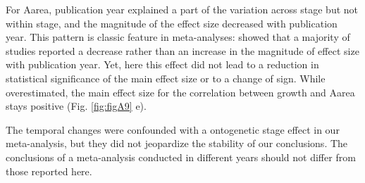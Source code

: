 \documentclass[10pt,twoside]{article}\usepackage[]{graphicx}\usepackage[]{color}
\begin{document}
For Aarea, publication year explained a part of the variation across stage but not within stage, and the magnitude of the effect size decreased with publication year. This pattern is classic feature in meta-analyses: \citealt{Koricheva:2013hy} showed that a majority of studies reported a decrease rather than an increase in the magnitude of effect size with publication year. Yet, here this effect did not lead to a reduction in statistical significance of the main effect size or to a change of sign. While overestimated, the main effect size for the correlation between growth and Aarea stays positive (Fig. \ref{fig:figA9} e).

The temporal changes were confounded with a ontogenetic stage effect in our meta-analysis, but they did not jeopardize the stability of our conclusions. The conclusions of a meta-analysis conducted in different years should not differ from those reported here.


\clearpage


\end{document}
